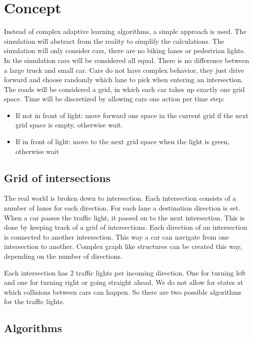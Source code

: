 \documentclass[a4paper,11pt]{article}
\begin{document}
\section{Concept}\label{sec:concept}

Instead of complex adaptive learning algorithms, a simple approach is used.
The simulation will abstract from the reality to simplify the calculations.
The simulation will only consider cars, there are no biking lanes or pedestrian lights.
In the simulation cars will be considered all equal.
There is no difference between a large truck and small car.
Cars do not have complex behavior, they just drive forward and choose randomly which lane to pick when
entering an intersection.
The roads will be considered a grid, in which each car takes up exactly one grid space.
Time will be discretized by allowing cars one action per time step:
\begin{itemize}
 \item If not in front of light: move forward one space in the current grid if the next grid space is empty, otherwise wait.
 \item If in front of light: move to the next grid space when the light is green, otherwise wait
\end{itemize}


\subsection{Grid of intersections}
The real world is broken down to intersection.
Each intersection consists of a number of lanes for each direction.
For each lane a destination direction is set.
When a car passes the traffic light, it passed on to the next intersection.
This is done by keeping track of a grid of intersections.
Each direction of an intersection is connected to another intersection.
This way a car can navigate from one intersection to another.
Complex graph like structures can be created this way, depending on the number of
directions.

Each intersection has 2 traffic lights per incoming direction.
One for turning left and one for turning right or going straight ahead.
We do not allow for states at which collisions between cars can happen.
So there are two possible algorithms for the traffic lights.

\subsection{Algorithms}
\end{document}
